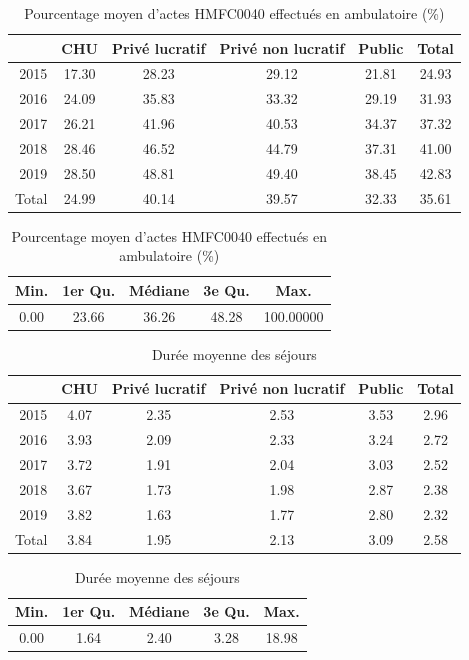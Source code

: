 \begin{table}[!ht]
\centering
\caption{Pourcentage moyen d'actes HMFC0040 effectués en ambulatoire (\%)} 
\label{ambu_HMFC0040}
\begin{tabular}{r|cccc|c}
  \hline
 & CHU & Privé lucratif & Privé non lucratif & Public & Total \\ 
  \hline
2015 & 17.30 & 28.23 & 29.12 & 21.81 & 24.93 \\ 
  2016 & 24.09 & 35.83 & 33.32 & 29.19 & 31.93 \\ 
  2017 & 26.21 & 41.96 & 40.53 & 34.37 & 37.32 \\ 
  2018 & 28.46 & 46.52 & 44.79 & 37.31 & 41.00 \\ 
  2019 & 28.50 & 48.81 & 49.40 & 38.45 & 42.83 \\ 
  \hline
  Total & 24.99 & 40.14 & 39.57 & 32.33 & 35.61 \\ 
   \hline
\end{tabular}
\bigskip

\begin{tabular}{ccccc}
  \hline
Min. & 1er Qu. & Médiane & 3e Qu. & Max. \\ 
  \hline
0.00 & 23.66 & 36.26 & 48.28 & 100.00000  \\ 
   \hline
\end{tabular}
\end{table}

\begin{table}[!ht]
\centering
\caption{Durée moyenne des séjours} 
\label{dms_HMFC0040}
\begin{tabular}{r|cccc|c}
  \hline
 & CHU & Privé lucratif & Privé non lucratif & Public & Total \\ 
  \hline
2015 & 4.07 & 2.35 & 2.53 & 3.53 & 2.96 \\ 
  2016 & 3.93 & 2.09 & 2.33 & 3.24 & 2.72 \\ 
  2017 & 3.72 & 1.91 & 2.04 & 3.03 & 2.52 \\ 
  2018 & 3.67 & 1.73 & 1.98 & 2.87 & 2.38 \\ 
  2019 & 3.82 & 1.63 & 1.77 & 2.80 & 2.32 \\ 
  \hline
  Total & 3.84 & 1.95 & 2.13 & 3.09 & 2.58 \\ 
   \hline
\end{tabular}

\bigskip

\begin{tabular}{ccccc}
  \hline
Min. & 1er Qu. & Médiane & 3e Qu. & Max. \\ 
  \hline
0.00 & 1.64 & 2.40 & 3.28 & 18.98 \\ 
   \hline
\end{tabular}
\end{table}

